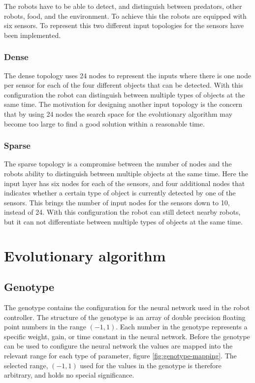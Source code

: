 The robots have to be able to detect, and distinguish between predators, other robots, food, and the environment.
To achieve this the robots are equipped with six sensors.
To represent this two different input topologies for the sensors have been implemented.

\subsubsection{Dense}
The dense topology uses 24 nodes to represent the inputs where there is one node per sensor for each of the four different objects that can be detected.
With this configuration the robot can distinguish between multiple types of objects at the same time.
The motivation for designing another input topology is the concern that by using 24 nodes the search space for the evolutionary algorithm may become too large to find a good solution within a reasonable time.
\subsubsection{Sparse}
The sparse topology is a compromise between the number of nodes and the robots ability to distinguish between multiple objects at the same time.
Here the input layer has six nodes for each of the sensors, and four additional nodes that indicates whether a certain type of object is currently detected by one of the sensors.
This brings the number of input nodes for the sensors down to 10, instead of 24.
With this configuration the robot can still detect nearby robots, but it can not differentiate between multiple types of objects at the same time.
			
\clearpage
\section{Evolutionary algorithm}
\subsection{Genotype}
\label{sec:genotype}
The genotype contains the configuration for the neural network used in the robot controller.
The structure of the genotype is an array of double precision floating point numbers in the range $(-1, 1)$.
Each number in the genotype represents a specific weight, gain, or time constant in the neural network.
Before the genotype can be used to configure the neural network the values are mapped into the relevant range for each type of parameter, figure \ref{fig:genotype-mapping}.
The selected range, $(-1, 1)$ used for the values in the genotype is therefore arbitrary, and holds no special significance. 
		
